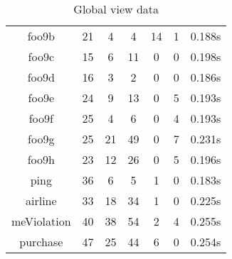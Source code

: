 \begin{table}[h]
\begin{tabular}{|c|c|c|c|c|c|c|}
foo9b & 21 & 4 & 4 & 14 & 1 & 0.188s \\ 
foo9c & 15 & 6 & 11 & 0 & 0 & 0.198s \\ 
foo9d & 16 & 3 & 2 & 0 & 0 & 0.186s \\ 
foo9e & 24 & 9 & 13 & 0 & 5 & 0.193s \\ 
foo9f & 25 & 4 & 6 & 0 & 4 & 0.193s \\ 
foo9g & 25 & 21 & 49 & 0 & 7 & 0.231s \\ 
foo9h & 23 & 12 & 26 & 0 & 5 & 0.196s \\ 
ping & 36 & 6 & 5 & 1 & 0 & 0.183s \\ 
airline & 33 & 18 & 34 & 1 & 0 & 0.225s \\ 
meViolation & 40 & 38 & 54 & 2 & 4 & 0.255s \\ 
purchase & 47 & 25 & 44 & 6 & 0 & 0.254s \\ 
\hline
\end{tabular}
\caption{Global view data}
\label{tab:gvbench}
\end{table}